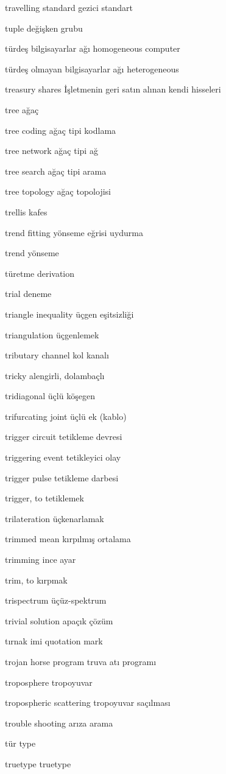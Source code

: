 \documentclass[12pt,fleqn]{article}\usepackage{../../common}
\begin{document}
travelling standard gezici standart

tuple değişken grubu

türdeş bilgisayarlar ağı homogeneous computer

türdeş olmayan bilgisayarlar ağı heterogeneous

treasury shares İşletmenin geri satın alınan kendi hisseleri

tree ağaç

tree coding ağaç tipi kodlama

tree network ağaç tipi ağ

tree search ağaç tipi arama

tree topology ağaç topolojisi

trellis kafes

trend fitting yönseme eğrisi uydurma

trend yönseme

türetme derivation

trial deneme

triangle inequality üçgen eşitsizliği

triangulation üçgenlemek

tributary channel kol kanalı

tricky alengirli, dolambaçlı

tridiagonal üçlü köşegen

trifurcating joint üçlü ek (kablo)

trigger circuit tetikleme devresi

triggering event tetikleyici olay

trigger pulse tetikleme darbesi

trigger, to tetiklemek

trilateration üçkenarlamak

trimmed mean kırpılmış ortalama

trimming ince ayar

trim, to kırpmak

trispectrum üçüz-spektrum

trivial solution apaçık çözüm

tırnak imi quotation mark

trojan horse program truva atı programı

troposphere tropoyuvar

tropospheric scattering tropoyuvar saçılması

trouble shooting arıza arama

tür type

truetype truetype
\end{document}
